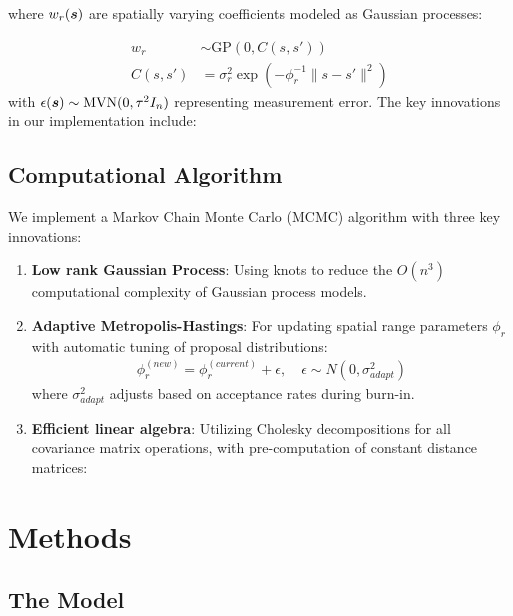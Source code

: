 where $w_r(\boldsymbol{s})$ are spatially varying coefficients modeled as Gaussian processes:

\begin{align*}
    w_r &\sim \text{GP}(0, C(s, s')) \\
    C(s, s') &= \sigma_r^2\exp{(-\phi_r^{-1}\|s-s'\|^2)}
\end{align*}
with $\epsilon(\boldsymbol{s}) \sim \text{MVN}(0, \tau^2 I_n)$ representing measurement error.
The key innovations in our implementation include:

\subsection*{Computational Algorithm}
We implement a Markov Chain Monte Carlo (MCMC) algorithm with three key innovations:

\begin{enumerate}
    \item \textbf{Low rank Gaussian Process}: Using knots to reduce the $O(n^3)$ computational complexity of Gaussian process models.
    
    \item \textbf{Adaptive Metropolis-Hastings}: For updating spatial range parameters $\phi_r$ with automatic tuning of proposal distributions:
    \begin{align*}
        \phi_r^{(new)} = \phi_r^{(current)} + \epsilon, \quad \epsilon \sim N(0, \sigma_{adapt}^2)
    \end{align*}
    where $\sigma_{adapt}^2$ adjusts based on acceptance rates during burn-in.
    
    \item \textbf{Efficient linear algebra}: Utilizing Cholesky decompositions for all covariance matrix operations, with pre-computation of constant distance matrices:
\end{enumerate}

\section{Methods}
\label{sec:methods}

\subsection{The Model}
\label{sec:model}

